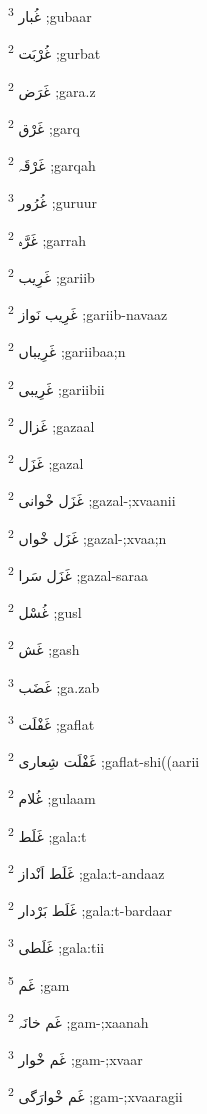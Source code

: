 \documentclass[12pt]{article}
\begin{document}
\begin{multicols}{5}
{\ur غُبار}   \textsuperscript{3} ;gubaar

{\ur غُرْبَت}   \textsuperscript{2} ;gurbat

{\ur غَرَض}   \textsuperscript{2} ;gara.z

{\ur غَرْق}   \textsuperscript{2} ;garq

{\ur غَرْقَہ}   \textsuperscript{2} ;garqah

{\ur غُرُور}   \textsuperscript{3} ;guruur

{\ur غَرَّہ}   \textsuperscript{2} ;garrah

{\ur غَرِیب}   \textsuperscript{2} ;gariib

{\ur غَرِیب نَواز}   \textsuperscript{2} ;gariib-navaaz

{\ur غَرِیباں}   \textsuperscript{2} ;gariibaa;n

{\ur غَرِیبی}   \textsuperscript{2} ;gariibii

{\ur غَزال}   \textsuperscript{2} ;gazaal

{\ur غَزَل}   \textsuperscript{2} ;gazal

{\ur غَزَل خْوانی}   \textsuperscript{2} ;gazal-;xvaanii

{\ur غَزَل خْواں}   \textsuperscript{2} ;gazal-;xvaa;n

{\ur غَزَل سَرا}   \textsuperscript{2} ;gazal-saraa

{\ur غُسْل}   \textsuperscript{2} ;gusl

{\ur غَش}   \textsuperscript{2} ;gash

{\ur غَضَب}   \textsuperscript{3} ;ga.zab

{\ur غَفْلَت}   \textsuperscript{3} ;gaflat

{\ur غَفْلَت شِعاری}   \textsuperscript{2} ;gaflat-shi((aarii

{\ur غُلام}   \textsuperscript{2} ;gulaam

{\ur غَلَط}   \textsuperscript{2} ;gala:t

{\ur غَلَط اَنْداز}   \textsuperscript{2} ;gala:t-andaaz

{\ur غَلَط بَرْدار}   \textsuperscript{2} ;gala:t-bardaar

{\ur غَلَطی}   \textsuperscript{3} ;gala:tii

{\ur غَم}   \textsuperscript{5} ;gam

{\ur غَم خانَہ}   \textsuperscript{2} ;gam-;xaanah

{\ur غَم خْوار}   \textsuperscript{3} ;gam-;xvaar

{\ur غَم خْوارَگی}   \textsuperscript{2} ;gam-;xvaaragii


\end{multicols}
\end{document}
